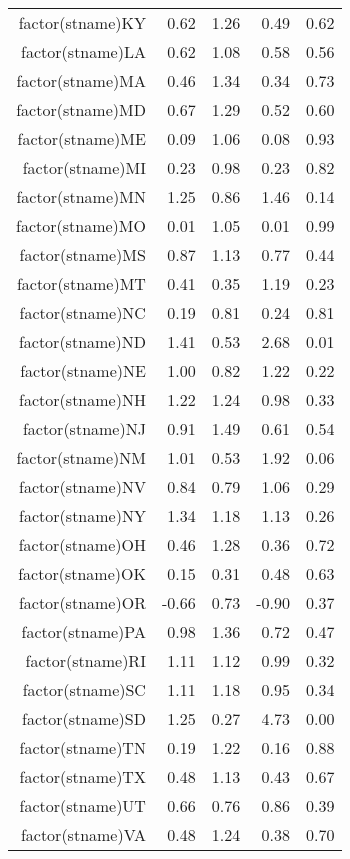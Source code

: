 \begin{table}[ht]
\begin{tabular}{rrrrr}
  factor(stname)KY & 0.62 & 1.26 & 0.49 & 0.62 \\ 
  factor(stname)LA & 0.62 & 1.08 & 0.58 & 0.56 \\ 
  factor(stname)MA & 0.46 & 1.34 & 0.34 & 0.73 \\ 
  factor(stname)MD & 0.67 & 1.29 & 0.52 & 0.60 \\ 
  factor(stname)ME & 0.09 & 1.06 & 0.08 & 0.93 \\ 
  factor(stname)MI & 0.23 & 0.98 & 0.23 & 0.82 \\ 
  factor(stname)MN & 1.25 & 0.86 & 1.46 & 0.14 \\ 
  factor(stname)MO & 0.01 & 1.05 & 0.01 & 0.99 \\ 
  factor(stname)MS & 0.87 & 1.13 & 0.77 & 0.44 \\ 
  factor(stname)MT & 0.41 & 0.35 & 1.19 & 0.23 \\ 
  factor(stname)NC & 0.19 & 0.81 & 0.24 & 0.81 \\ 
  factor(stname)ND & 1.41 & 0.53 & 2.68 & 0.01 \\ 
  factor(stname)NE & 1.00 & 0.82 & 1.22 & 0.22 \\ 
  factor(stname)NH & 1.22 & 1.24 & 0.98 & 0.33 \\ 
  factor(stname)NJ & 0.91 & 1.49 & 0.61 & 0.54 \\ 
  factor(stname)NM & 1.01 & 0.53 & 1.92 & 0.06 \\ 
  factor(stname)NV & 0.84 & 0.79 & 1.06 & 0.29 \\ 
  factor(stname)NY & 1.34 & 1.18 & 1.13 & 0.26 \\ 
  factor(stname)OH & 0.46 & 1.28 & 0.36 & 0.72 \\ 
  factor(stname)OK & 0.15 & 0.31 & 0.48 & 0.63 \\ 
  factor(stname)OR & -0.66 & 0.73 & -0.90 & 0.37 \\ 
  factor(stname)PA & 0.98 & 1.36 & 0.72 & 0.47 \\ 
  factor(stname)RI & 1.11 & 1.12 & 0.99 & 0.32 \\ 
  factor(stname)SC & 1.11 & 1.18 & 0.95 & 0.34 \\ 
  factor(stname)SD & 1.25 & 0.27 & 4.73 & 0.00 \\ 
  factor(stname)TN & 0.19 & 1.22 & 0.16 & 0.88 \\ 
  factor(stname)TX & 0.48 & 1.13 & 0.43 & 0.67 \\ 
  factor(stname)UT & 0.66 & 0.76 & 0.86 & 0.39 \\ 
  factor(stname)VA & 0.48 & 1.24 & 0.38 & 0.70 \\ 

\end{tabular}
\end{table}
